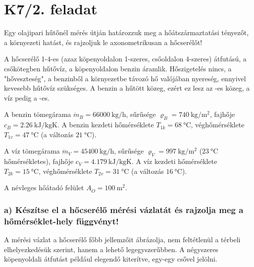 

\section*{K7/2. feladat}
Egy olajipari hűtőnél mérés útján határozzuk meg a hőátszármaztatási tényezőt, a környezeti hatást, és rajzoljuk le axonometrikusan a hőcserélőt!

A hőcserélő 1-4-es (azaz köpenyoldalon 1-szeres, csőoldalon 4-szeres) átfutású, a csőkötegben hűtővíz, a köpenyoldalon benzin  áramlik. Hőszigetelés nincs, a "hőveszteség", a benzinből a környezetbe távozó hő valójában nyereség, ennyivel kevesebb hűtővíz szükséges. A benzin a hűtött közeg, ezért ez lesz az -es közeg, a víz pedig a -es.

A benzin tömegárama $\dot{m}_B = \SI{66000}{\kilogram\per\hour}$, sűrűsége $\varrho_B = \SI{740}{\kilogram\per\meter\squared}$, fajhője $c_B = \SI{2.26}{\kilo\joule\per\kilogram\kelvin}$. A benzin kezdeti hőmérséklete $T_{1k} = \SI{68}{\celsius}$, véghőmérséklete $T_{1v} = \SI{47}{\celsius}$ (a változás $\SI{21}{\celsius}$).

A víz tömegárama $\dot{m}_V = \SI{45400}{\kilogram\per\hour}$, sűrűsége $\varrho_V = \SI{997}{\kilogram\per\meter\squared}$ ($\SI{23}{\celsius}$ hőmérsékletes), fajhője $c_V = \SI{4.179}{\kilo\joule\per\kilogram\kelvin}$. A víz kezdeti hőmérséklete $T_{2k} = \SI{15}{\celsius}$, véghőmérséklete $T_{2v} = \SI{31}{\celsius}$ (a változás $\SI{16}{\celsius}$).

A névleges hőátadó felület $A_{\ddot{O}} = \SI{100}{\meter\squared}$.

\subsubsection*{a) Készítse el a hőcserélő mérési vázlatát és rajzolja meg a hőmérséklet-hely függvényt!}
A mérési vázlat a hőcserélő főbb jellemzőit ábrázolja, nem feltétlenül a térbeli elhelyezkedésük szerint, hanem a lehető legegyszerűbben. A négyszeres köpenyoldali átfutást például elegendő kiterítve, egy-egy csővel jelölni.

\vspace{-5mm}

